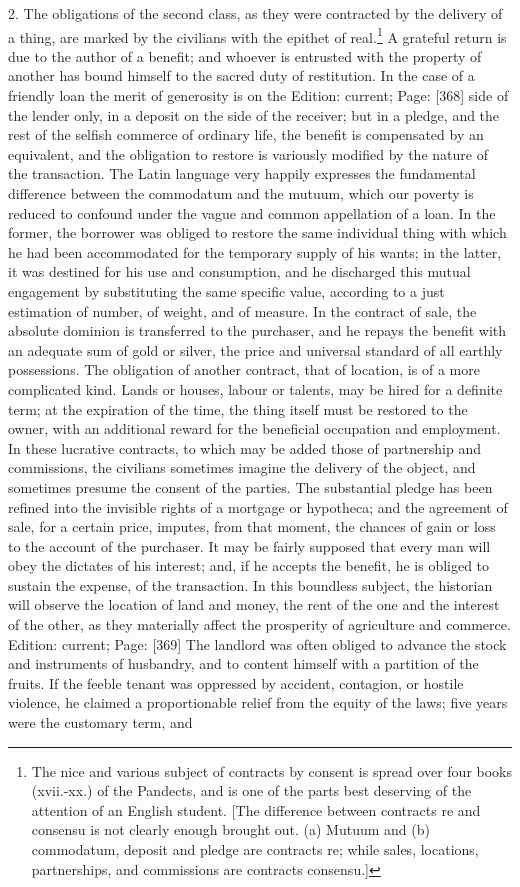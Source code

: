2. The obligations of the second class, as they were contracted by the delivery of a thing, are marked by the civilians with the epithet of real.\footnote{The nice and various subject of contracts by consent is spread over four books (xvii.-xx.) of the Pandects, and is one of the parts best deserving of the attention of an English student. [The difference between contracts re and consensu is not clearly enough brought out. (a) Mutuum and (b) commodatum, deposit and pledge are contracts re; while sales, locations, partnerships, and commissions are contracts consensu.]} A grateful return is due to the author of a benefit; and whoever is entrusted with the property of another has bound himself to the sacred duty of restitution. In the case of a friendly loan the merit of generosity is on the Edition: current; Page: [368] side of the lender only, in a deposit on the side of the receiver; but in a pledge, and the rest of the selfish commerce of ordinary life, the benefit is compensated by an equivalent, and the obligation to restore is variously modified by the nature of the transaction. The Latin language very happily expresses the fundamental difference between the commodatum and the mutuum, which our poverty is reduced to confound under the vague and common appellation of a loan. In the former, the borrower was obliged to restore the same individual thing with which he had been accommodated for the temporary supply of his wants; in the latter, it was destined for his use and consumption, and he discharged this mutual engagement by substituting the same specific value, according to a just estimation of number, of weight, and of measure. In the contract of sale, the absolute dominion is transferred to the purchaser, and he repays the benefit with an adequate sum of gold or silver, the price and universal standard of all earthly possessions. The obligation of another contract, that of location, is of a more complicated kind. Lands or houses, labour or talents, may be hired for a definite term; at the expiration of the time, the thing itself must be restored to the owner, with an additional reward for the beneficial occupation and employment. In these lucrative contracts, to which may be added those of partnership and commissions, the civilians sometimes imagine the delivery of the object, and sometimes presume the consent of the parties. The substantial pledge has been refined into the invisible rights of a mortgage or hypotheca; and the agreement of sale, for a certain price, imputes, from that moment, the chances of gain or loss to the account of the purchaser. It may be fairly supposed that every man will obey the dictates of his interest; and, if he accepts the benefit, he is obliged to sustain the expense, of the transaction. In this boundless subject, the historian will observe the location of land and money, the rent of the one and the interest of the other, as they materially affect the prosperity of agriculture and commerce. Edition: current; Page: [369] The landlord was often obliged to advance the stock and instruments of husbandry, and to content himself with a partition of the fruits. If the feeble tenant was oppressed by accident, contagion, or hostile violence, he claimed a proportionable relief from the equity of the laws; five years were the customary term, and 